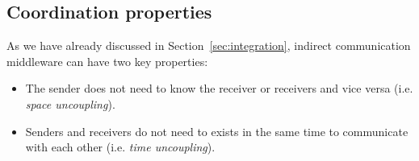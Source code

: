 


\subsection{Coordination properties}
\label{sec:coordination_properties}

As we have already discussed in Section~\ref{sec:integration}, indirect communication middleware can have two key properties:
\begin{itemize}
  \item The sender does not need to know the receiver or receivers and vice versa (i.e. \emph{space uncoupling}).
  \item Senders and receivers do not need to exists in the same time to communicate with each other (i.e. \emph{time uncoupling}).
\end{itemize}


